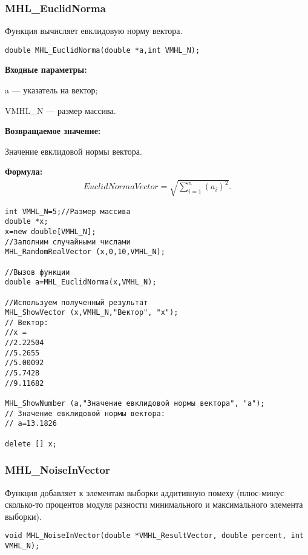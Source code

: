 \documentclass[a4paper,12pt]{article}
\begin{document}
\subsubsection{MHL\_EuclidNorma}\label{MHL_EuclidNorma}

Функция вычисляет евклидовую норму вектора.


\begin{lstlisting}[label=code_syntax_MHL_EuclidNorma,caption=Синтаксис]
double MHL_EuclidNorma(double *a,int VMHL_N);
\end{lstlisting}

\textbf{Входные параметры:}  

 a --- указатель на вектор;
 
 VMHL\_N ---  размер массива.
 
\textbf{Возвращаемое значение:}

 Значение евклидовой нормы вектора.

\textbf{Формула:}
\begin{eqnarray*}
EuclidNormaVector=\sqrt{\sum_{i=1}^{n} {\left( a_i\right)}^2 }.
\end{eqnarray*}


\begin{lstlisting}[label=code_use_MHL_EuclidNorma,caption=Пример использования]
int VMHL_N=5;//Размер массива
double *x;
x=new double[VMHL_N];
//Заполним случайными числами
MHL_RandomRealVector (x,0,10,VMHL_N);

//Вызов функции
double a=MHL_EuclidNorma(x,VMHL_N);

//Используем полученный результат
MHL_ShowVector (x,VMHL_N,"Вектор", "x");
// Вектор:
//x =
//2.22504
//5.2655
//5.00092
//5.7428
//9.11682

MHL_ShowNumber (a,"Значение евклидовой нормы вектора", "a");
// Значение евклидовой нормы вектора:
// a=13.1826

delete [] x;
\end{lstlisting}

\subsubsection{MHL\_NoiseInVector}\label{MHL_NoiseInVector}

Функция добавляет к элементам выборки аддитивную помеху (плюс-минус сколько-то процентов модуля разности минимального и максимального элемента выборки).


\begin{lstlisting}[label=code_syntax_MHL_NoiseInVector,caption=Синтаксис]
void MHL_NoiseInVector(double *VMHL_ResultVector, double percent, int VMHL_N);
\end{lstlisting}
\end{document}

